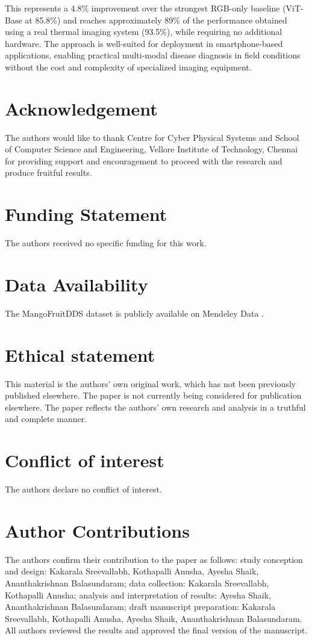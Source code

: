 \documentclass[utf8]{FrontiersinHarvard} %
\begin{document}
This represents a 4.8\% improvement over the strongest RGB-only baseline (ViT-Base at 85.8\%) and reaches approximately 89\% of the performance obtained using a real thermal imaging system (93.5\%), while requiring no additional hardware. The approach is well-suited for deployment in smartphone-based applications, enabling practical multi-modal disease diagnosis in field conditions without the cost and complexity of specialized imaging equipment.


\section*{Acknowledgement}
The authors would like to thank Centre for Cyber Physical Systems and School of Computer Science and Engineering, Vellore Institute of Technology, Chennai for providing support and encouragement to proceed with the research and produce fruitful results.

\section*{Funding Statement}
The authors received no specific funding for this work.

\section*{Data Availability}
The MangoFruitDDS dataset is publicly available on Mendeley Data \cite{MendeleyDataset}.

\section*{Ethical statement}
This material is the authors' own original work, which has not been previously published elsewhere. The paper is not currently being considered for publication elsewhere. The paper reflects the authors' own research and analysis in a truthful and complete manner.

\section*{Conflict of interest}
The authors declare no conflict of interest.

\section*{Author Contributions}
The authors confirm their contribution to the paper as follows: study conception and design: Kakarala Sreevallabh, Kothapalli Anusha, Ayesha Shaik, Ananthakrishnan Balasundaram; data collection: Kakarala Sreevallabh, Kothapalli Anusha; analysis and interpretation of results: Ayesha Shaik, Ananthakrishnan Balasundaram; draft manuscript preparation: Kakarala Sreevallabh, Kothapalli Anusha, Ayesha Shaik, Ananthakrishnan Balasundaram. All authors reviewed the results and approved the final version of the manuscript.
\end{document}
